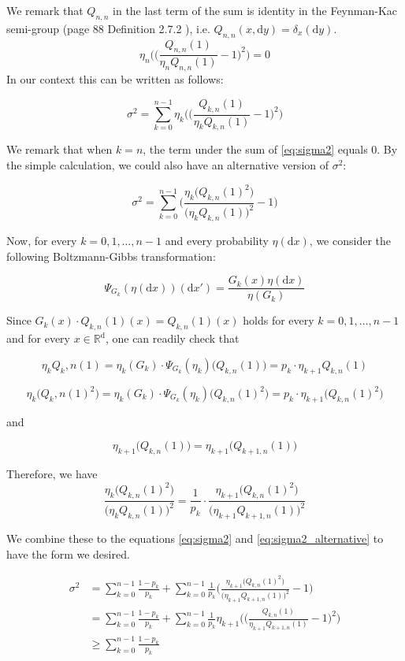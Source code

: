 \documentclass[a4paper,10pt]{article}
\begin{document}
We remark that $Q_{n,n}$ in the last term of the sum is identity in the Feynman-Kac semi-group (page 88 Definition 2.7.2 \cite{del2004feynman}), i.e. $Q_{n,n}(x,\mathrm{d}y) = \delta_{x}(\mathrm{d}y)$.
$$\eta_n \Big( \big( \frac{Q_{n,n}(1)}{\eta_n Q_{n,n}(1)} - 1\big)^2\Big) = 0$$
In our context this can be written as follows:

\begin{equation}\label{eq:sigma2}
 \sigma^2  
=  \sum_{k = 0}^{n-1} \eta_k\Big(\big(\frac{Q_{k,n}(1)}{\eta_k Q_{k,n}(1)} - 1\big)^2\Big)
\end{equation}

We remark that when $k = n$, the term under the sum of \eqref{eq:sigma2} 
equals 0. By the simple calculation, we could also have an alternative version of $\sigma^2$:

\begin{equation}\label{eq:sigma2_alternative}
 \sigma^2  
 =  \sum_{k = 0}^{n-1} \Bigg( \frac{\eta_k \big(Q_{k,n}(1)^2\big)}{\big(\eta_k Q_{k,n}(1)\big)^2} - 1 \Bigg)
\end{equation}

Now, for every $k = 0,1,\dots,n-1$ and every probability $\eta(\mathrm{d}x)$, we consider the following Boltzmann-Gibbs transformation:

$$\Psi_{G_k}(\eta(\mathrm{d}x))(\mathrm{d}x') = \frac{G_k(x) \eta(\mathrm{d}x) }{\eta (G_k)}$$

Since $G_k(x) \cdot Q_{k,n}(1)(x) = Q_{k,n}(1)(x)$ holds for every $k = 0,1,\dots,n-1$ and for every $x \in \mathds{R}^{\mathrm{d}}$, one can readily check that

$$\eta_{k} Q_k,n(1) = \eta_k(G_k) \cdot\Psi_{G_k} (\eta_k) \big(Q_{k,n}(1)\big) = p_k \cdot \eta_{k+1} Q_{k,n}(1) $$

$$\eta_{k} \big({Q_k,n}(1)^2\big) = \eta_k(G_k)\cdot\Psi_{G_k} (\eta_k) \big(Q_{k,n}(1)^2\big) = p_k \cdot \eta_{k+1} \big(Q_{k,n}(1)^2\big)$$

and

$$\eta_{k+1} \big( Q_{k,n}(1)\big) = \eta_{k+1} \big( Q_{k+1,n}(1)\big)$$

Therefore, we have 
$$\frac{\eta_k \big(Q_{k,n}(1)^2\big)}{\big(\eta_k Q_{k,n}(1)\big)^2} = \frac{1}{p_k}\cdot\frac{\eta_{k+1} \big(Q_{k,n}(1)^2\big)}{\big(\eta_{k+1} Q_{k+1,n}(1)\big)^2}$$

We combine these to the equations \eqref{eq:sigma2} and \eqref{eq:sigma2_alternative} to have the form we desired.

\begin{equation*}
\begin{split}
 \sigma^2  
 & =\sum_{k = 0}^{n-1} \frac{1-p_k}{p_k} +
 \sum_{k = 0}^{n-1} \frac{1}{p_k} \Bigg( \frac{\eta_{k+1} \big(Q_{k,n}(1)^2\big)}{\big(\eta_{k+1} Q_{k+1,n}(1)\big)^2} - 1 \Bigg) \\
 & = \sum_{k = 0}^{n-1} \frac{1-p_k}{p_k} +
 \sum_{k = 0}^{n-1} \frac{1}{p_{k}} \eta_{k+1}\Big(\big(\frac{Q_{k,n}(1)}{\eta_{k+1} Q_{k+1,n}(1)} - 1\big)^2\Big)\\
 & \geq \sum_{k = 0}^{n-1} \frac{1-p_k}{p_k}
\end{split}
\end{equation*}
\end{document}
